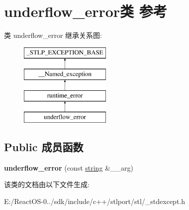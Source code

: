 \hypertarget{classunderflow__error}{}\section{underflow\+\_\+error类 参考}
\label{classunderflow__error}
类 underflow\+\_\+error 继承关系图\+:\begin{figure}[H]
\begin{center}
\leavevmode
\includegraphics[height=4.000000cm]{classunderflow__error}
\end{center}
\end{figure}
\subsection*{Public 成员函数}
\begin{DoxyCompactItemize}
\item 
\mbox{\label{classunderflow__error_ab30124ab63e052a5521577b36488f54a}} 
{\bfseries underflow\+\_\+error} (const \hyperlink{structstring}{string} \&\+\_\+\+\_\+arg)
\end{DoxyCompactItemize}


该类的文档由以下文件生成\+:\begin{DoxyCompactItemize}
\item 
E\+:/\+React\+O\+S-\/0../sdk/include/c++/stlport/stl/\+\_\+stdexcept.\+h\end{DoxyCompactItemize}

